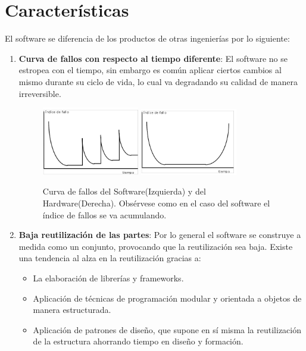 \section{Características}
El software se diferencia de los productos de otras ingenierías por lo siguiente:
\begin{enumerate}

    \item \textbf{Curva de fallos con respecto al tiempo diferente}:
    El software no se estropea con el tiempo, sin embargo es común aplicar ciertos cambios al mismo durante su ciclo de vida, lo cual va degradando su calidad de manera irreversible.
    \begin{figure}[h]
        \centering
        \includegraphics[width=0.4\textwidth]{Resources/fallosSoftwareReales.png}
        \includegraphics[width=0.4\textwidth]{Resources/fallosHardware.png}
        \caption{Curva de fallos del Software(Izquierda) y del Hardware(Derecha). Obsérvese como en el caso del software el índice de fallos se va acumulando.}
    \end{figure}
    \item \textbf{Baja reutilización de las partes}:
    Por lo general el software se construye a medida como un conjunto, provocando que la reutilización sea baja. Existe una tendencia al alza en la reutilización gracias a:
    \begin{itemize}
        \item La elaboración de librerías y frameworks.
        \item Aplicación de técnicas de programación modular y orientada a objetos de manera estructurada. 
        \item Aplicación de patrones de diseño, que supone en sí misma la reutilización de la estructura ahorrando tiempo en diseño y formación.
    \end{itemize}
\end{enumerate}

